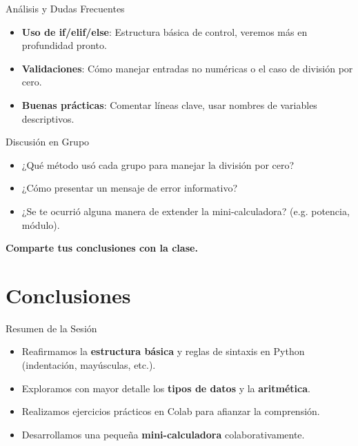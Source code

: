 \documentclass[10pt]{beamer}
\begin{document}
\begin{frame}{Análisis y Dudas Frecuentes}
  \begin{itemize}
    \item \textbf{Uso de if/elif/else}: Estructura básica de control, veremos más en profundidad pronto.
    \item \textbf{Validaciones}: Cómo manejar entradas no numéricas o el caso de división por cero.
    \item \textbf{Buenas prácticas}: Comentar líneas clave, usar nombres de variables descriptivos.
  \end{itemize}
\end{frame}

\begin{frame}{Discusión en Grupo}
  \begin{itemize}
    \item ¿Qué método usó cada grupo para manejar la división por cero?
    \item ¿Cómo presentar un mensaje de error informativo?
    \item ¿Se te ocurrió alguna manera de extender la mini-calculadora? (e.g. potencia, módulo).
  \end{itemize}
  \vspace{0.2cm}
  \textbf{Comparte tus conclusiones con la clase.}
\end{frame}

\section{Conclusiones}

\begin{frame}{Resumen de la Sesión}
  \begin{itemize}
    \item Reafirmamos la \textbf{estructura básica} y reglas de sintaxis en Python (indentación, mayúsculas, etc.).
    \item Exploramos con mayor detalle los \textbf{tipos de datos} y la \textbf{aritmética}.
    \item Realizamos ejercicios prácticos en Colab para afianzar la comprensión.
    \item Desarrollamos una pequeña \textbf{mini-calculadora} colaborativamente.
  \end{itemize}
\end{frame}
\end{document}
